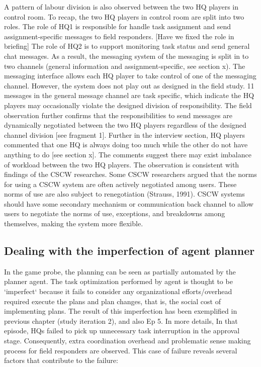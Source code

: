 A pattern of labour division is also observed between the two HQ players in control room. To recap, the two HQ players in control room are split into two roles. The role of HQ1 is responsible for handle task assignment and send assignment-specific messages to field responders. [Have we fixed the role in briefing] The role of HQ2 is to support monitoring task status and send general chat messages. As a result, the messaging system of the messaging is split in to two channels (general information and assignment-specific, see section x). The messaging interface allows each HQ player to take control of one of the messaging channel.  However, the system does not play out as designed in the field study. 11 messages in the general message channel are task specific, which indicate the HQ players may occasionally violate the designed division of responsibility. The field observation further confirms that the responsibilities to send messages are dynamically negotiated between the two HQ players regardless of the designed channel division [see fragment 1]. Further in the interview section, HQ players commented that one HQ is always doing too much while the other do not have anything to do [see section x]. The comments suggest there may exist imbalance of workload between the two HQ players. The observation is consistent with findings of the CSCW researches. Some CSCW researchers argued that the norms for using a CSCW system are often actively negotiated among users. These norms of use are also subject to renegotiation (Strauss, 1991). CSCW systems should have some secondary mechanism or communication back channel to allow users to negotiate the norms of use, exceptions, and breakdowns among themselves, making the system more flexible.

\subsection{Dealing with the imperfection of agent planner}\label{sec:huilimperfection}

In the game probe, the planning can be seen as partially automated by the planner agent. The task optimization performed by agent is thought to be `imperfect` because it fails to consider any organizational efforts/overhead required execute the plans and plan changes, that is, the social cost of implementing plans. The result of this imperfection has been exemplified in previous chapter (study iteration 2), and also Ep 5. In more details, In that episode, HQs failed to pick up unnecessary task interruption in the approval stage. Consequently, extra coordination overhead and problematic sense making process for field responders are observed. This case of failure reveals several factors that contribute to the failure: \\

